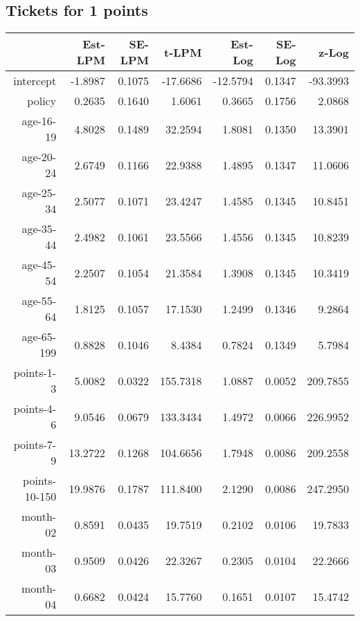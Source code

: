 \documentclass[10pt]{article}
\begin{document}

\subsection*{Tickets for 1 points}




\begin{table}[ht]
\centering
\begin{tabular}{rrrrrrr}
  \hline
 & Est-LPM & SE-LPM & t-LPM & Est-Log & SE-Log & z-Log \\ 
  \hline
intercept & -1.8987 & 0.1075 & -17.6686 & -12.5794 & 0.1347 & -93.3993 \\ 
  policy & 0.2635 & 0.1640 & 1.6061 & 0.3665 & 0.1756 & 2.0868 \\ 
  age-16-19 & 4.8028 & 0.1489 & 32.2594 & 1.8081 & 0.1350 & 13.3901 \\ 
  age-20-24 & 2.6749 & 0.1166 & 22.9388 & 1.4895 & 0.1347 & 11.0606 \\ 
  age-25-34 & 2.5077 & 0.1071 & 23.4247 & 1.4585 & 0.1345 & 10.8451 \\ 
  age-35-44 & 2.4982 & 0.1061 & 23.5566 & 1.4556 & 0.1345 & 10.8239 \\ 
  age-45-54 & 2.2507 & 0.1054 & 21.3584 & 1.3908 & 0.1345 & 10.3419 \\ 
  age-55-64 & 1.8125 & 0.1057 & 17.1530 & 1.2499 & 0.1346 & 9.2864 \\ 
  age-65-199 & 0.8828 & 0.1046 & 8.4384 & 0.7824 & 0.1349 & 5.7984 \\ 
  points-1-3 & 5.0082 & 0.0322 & 155.7318 & 1.0887 & 0.0052 & 209.7855 \\ 
  points-4-6 & 9.0546 & 0.0679 & 133.3434 & 1.4972 & 0.0066 & 226.9952 \\ 
  points-7-9 & 13.2722 & 0.1268 & 104.6656 & 1.7948 & 0.0086 & 209.2558 \\ 
  points-10-150 & 19.9876 & 0.1787 & 111.8400 & 2.1290 & 0.0086 & 247.2950 \\ 
  month-02 & 0.8591 & 0.0435 & 19.7519 & 0.2102 & 0.0106 & 19.7833 \\ 
  month-03 & 0.9509 & 0.0426 & 22.3267 & 0.2305 & 0.0104 & 22.2666 \\ 
  month-04 & 0.6682 & 0.0424 & 15.7760 & 0.1651 & 0.0107 & 15.4742 \\ 

\end{tabular}
\end{table}
\end{document}
